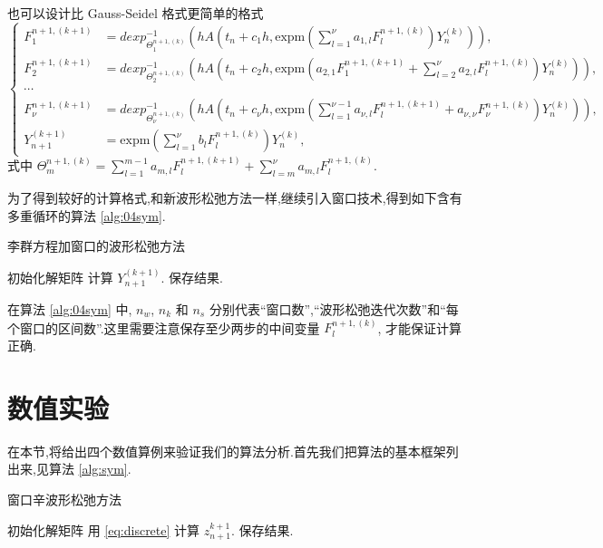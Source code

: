 也可以设计比 Gauss-Seidel 格式更简单的格式
\begin{equation*}
	\left\lbrace\begin{aligned}
		F_1^{n+1,(k+1)}&=dexp_{\Theta_1^{n+1,(k)}}^{-1}(hA(t_n+c_1h,\mbox{expm}(\sum_{l=1}^{\nu}a_{1,l}F_l^{n+1,(k)})Y_n^{(k)})),\\
		F_2^{n+1,(k+1)}&=dexp_{\Theta_2^{n+1,(k)}}^{-1}(hA(t_n+c_2h,\mbox{expm}(a_{2,1}F_1^{n+1,(k+1)}+\sum_{l=2}^{\nu}a_{2,l}F_l^{n+1,(k)})Y_n^{(k)})),\\
		\cdots \\
		F_{\nu}^{n+1,(k+1)}&=dexp_{\Theta_{\nu}^{n+1,(k)}}^{-1}(hA(t_n+c_{\nu}h,\mbox{expm}(\sum_{l=1}^{\nu-1}a_{\nu,l}F_{l}^{n+1,(k+1)}+a_{\nu,\nu}F_{\nu}^{n+1,(k)})Y_n^{(k)})),\\
		Y_{n+1}^{(k+1)}&=\mbox{expm}(\sum_{l=1}^{\nu}b_lF_l^{n+1,(k)})Y_n^{(k)},
	\end{aligned}\right.
\end{equation*}
式中 $\Theta_m^{n+1,(k)} = \sum_{l=1}^{m-1}a_{m,l}F_{l}^{n+1,(k+1)}+\sum_{l=m}^{\nu}a_{m,l}F_l^{n+1,(k)}$.

为了得到较好的计算格式,和新波形松弛方法一样,继续引入窗口技术,得到如下含有多重循环的算法 \ref{alg:04sym}.

\begin{algorithm}
\caption{李群方程加窗口的波形松弛方法}
\label{alg:04sym}
\begin{algorithmic}
\STATE 初始化解矩阵
             \STATE 计算 $Y_{n+1}^{(k+1)}$.
        \ENDFOR
    \ENDFOR
\ENDFOR
\STATE 保存结果.
\end{algorithmic}
\end{algorithm}
在算法 \ref{alg:04sym} 中, $n_w$, $n_k$ 和 $n_s$ 分别代表``窗口数'',``波形松弛迭代次数''和``每个窗口的区间数''.这里需要注意保存至少两步的中间变量 $F_l^{n+1,(k)}$, 才能保证计算正确.

\section{数值实验}\label{sec:03numerical}
在本节,将给出四个数值算例来验证我们的算法分析.首先我们把算法的基本框架列出来,见算法 \ref{alg:sym}.

\begin{algorithm}
\caption{窗口辛波形松弛方法}
\label{alg:sym}
\begin{algorithmic}
\STATE 初始化解矩阵
             \STATE 用 \eqref{eq:discrete} 计算 $z_{n+1}^{k+1}$.
        \ENDFOR
    \ENDFOR
\ENDFOR
\STATE 保存结果.
\end{algorithmic}
\end{algorithm}

